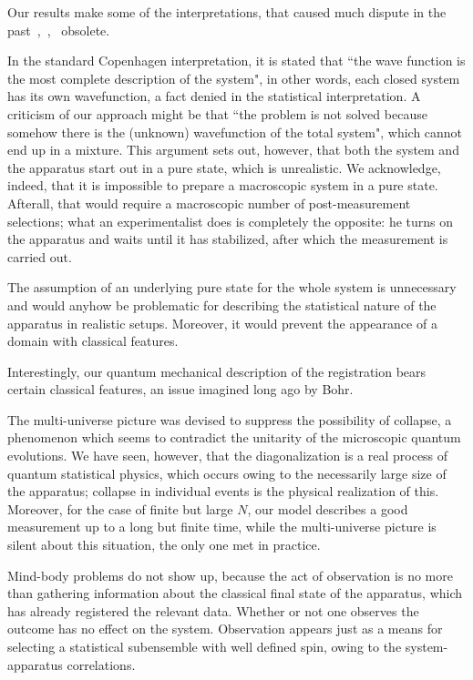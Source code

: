 \documentclass[aps,prb,floatfix,twocolumn]{revtex4}
\begin{document}
Our results make some of the interpretations, that caused much dispute in
the past~\cite{wh},~\cite{Vaxjo},~\cite{Schlosshauer} obsolete. 


In the standard Copenhagen interpretation, it is stated that ``the wave function
is the most complete description of the system", in other words, each closed 
system has its own wavefunction, a fact denied in the statistical interpretation. 
A criticism of our approach might be that 
``the problem is not solved because somehow there is the (unknown) wavefunction
of the total system", which cannot end up in a mixture.
This argument sets out, however, that both the system and the apparatus start
out in a pure state, which is unrealistic. We acknowledge, indeed, that it is 
impossible to prepare a macroscopic system in a pure state. 
Afterall, that would require a macroscopic number of post-measurement selections; 
what an experimentalist does is completely the opposite: 
he turns on the apparatus and waits until it has stabilized, after
which the measurement is carried out.  

The assumption of an underlying pure state for the whole system is 
unnecessary and would anyhow be problematic for describing 
the statistical nature of the apparatus in realistic setups.
Moreover, it would prevent the appearance of a domain with classical features.
 
Interestingly, our quantum mechanical description of the registration 
bears certain classical features, an issue imagined long ago by Bohr.


The multi-universe picture was devised to suppress the possibility of collapse, 
a phenomenon which seems to contradict the unitarity of the microscopic quantum
evolutions. We have seen, however, that the  diagonalization is a real process of 
quantum statistical physics, which occurs owing to the necessarily large size 
of the apparatus; collapse in individual events is the physical realization 
of this. Moreover, for the case of finite but large $N$, 
our model describes a good measurement up to a long but finite time, while the 
multi-universe picture is silent about this situation, the only one met in
practice.

Mind-body problems do not show up, because the act of observation is no more
than gathering information about the classical final state of the apparatus, 
which has already registered the relevant data. 
Whether or not one observes the outcome has no effect on the system. 
Observation appears just as a means for selecting a statistical subensemble 
with well defined spin, owing to the system-apparatus correlations. 
\end{document}

